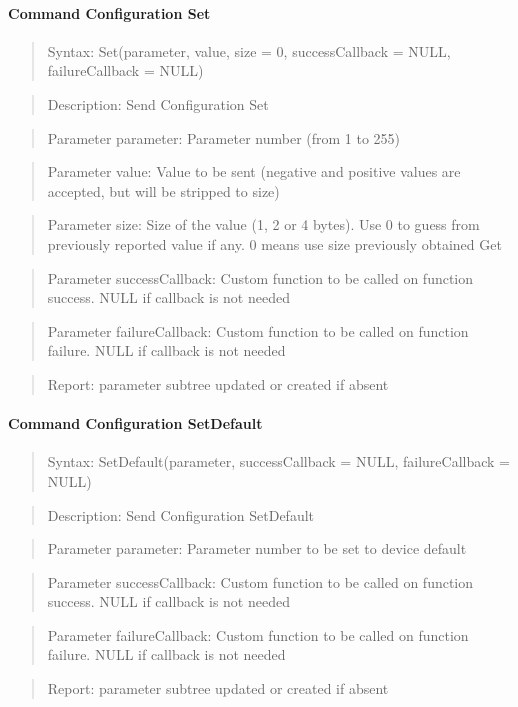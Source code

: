 \paragraph{Command Configuration Set}
\begin{quote}Syntax: Set(parameter, value, size = 0, successCallback = NULL, failureCallback = NULL)\end{quote}
\begin{quote}Description: Send Configuration Set\end{quote}
\begin{quote}Parameter parameter: Parameter number (from 1 to 255)\end{quote}
\begin{quote}Parameter value: Value to be sent (negative and positive values are accepted, but will be stripped to size)\end{quote}
\begin{quote}Parameter size: Size of the value (1, 2 or 4 bytes). Use 0 to guess from previously reported value if any. 0 means use size previously obtained Get\end{quote}
\begin{quote}Parameter successCallback: Custom function to be called on function success. NULL if callback is not needed\end{quote}
\begin{quote}Parameter failureCallback: Custom function to be called on function failure. NULL if callback is not needed\end{quote}
\begin{quote}Report: parameter subtree updated or created if absent\end{quote}

\paragraph{Command Configuration SetDefault}
\begin{quote}Syntax: SetDefault(parameter, successCallback = NULL, failureCallback = NULL)\end{quote}
\begin{quote}Description: Send Configuration SetDefault\end{quote}
\begin{quote}Parameter parameter: Parameter number to be set to device default\end{quote}
\begin{quote}Parameter successCallback: Custom function to be called on function success. NULL if callback is not needed\end{quote}
\begin{quote}Parameter failureCallback: Custom function to be called on function failure. NULL if callback is not needed\end{quote}
\begin{quote}Report: parameter subtree updated or created if absent\end{quote}


